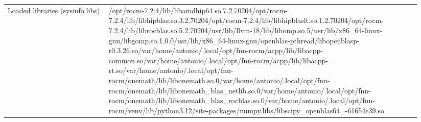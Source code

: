\begin{longtable}{>{\raggedright\arraybackslash}p{0.23\linewidth}>{\raggedright\arraybackslash}p{0.71\linewidth}}
Loaded libraries (sysinfo.libs) & /\allowbreak{}opt/\allowbreak{}rocm-7.2.4/\allowbreak{}lib/\allowbreak{}libamdhip64.so.7.2.70204\newline /\allowbreak{}opt/\allowbreak{}rocm-7.2.4/\allowbreak{}lib/\allowbreak{}libhipblas.so.3.2.70204\newline /\allowbreak{}opt/\allowbreak{}rocm-7.2.4/\allowbreak{}lib/\allowbreak{}libhipblaslt.so.1.2.70204\newline /\allowbreak{}opt/\allowbreak{}rocm-7.2.4/\allowbreak{}lib/\allowbreak{}librocblas.so.5.2.70204\newline /\allowbreak{}usr/\allowbreak{}lib/\allowbreak{}llvm-18/\allowbreak{}lib/\allowbreak{}libomp.so.5\newline /\allowbreak{}usr/\allowbreak{}lib/\allowbreak{}x86\_\allowbreak{}64-linux-gnu/\allowbreak{}libgomp.so.1.0.0\newline /\allowbreak{}usr/\allowbreak{}lib/\allowbreak{}x86\_\allowbreak{}64-linux-gnu/\allowbreak{}openblas-pthread/\allowbreak{}libopenblasp-r0.3.26.so\newline /\allowbreak{}var/\allowbreak{}home/\allowbreak{}antonio/\allowbreak{}.local/\allowbreak{}opt/\allowbreak{}fnn-rocm/\allowbreak{}acpp/\allowbreak{}lib/\allowbreak{}libacpp-common.so\newline /\allowbreak{}var/\allowbreak{}home/\allowbreak{}antonio/\allowbreak{}.local/\allowbreak{}opt/\allowbreak{}fnn-rocm/\allowbreak{}acpp/\allowbreak{}lib/\allowbreak{}libacpp-rt.so\newline /\allowbreak{}var/\allowbreak{}home/\allowbreak{}antonio/\allowbreak{}.local/\allowbreak{}opt/\allowbreak{}fnn-rocm/\allowbreak{}onemath/\allowbreak{}lib/\allowbreak{}libonemath.so.0\newline /\allowbreak{}var/\allowbreak{}home/\allowbreak{}antonio/\allowbreak{}.local/\allowbreak{}opt/\allowbreak{}fnn-rocm/\allowbreak{}onemath/\allowbreak{}lib/\allowbreak{}libonemath\_\allowbreak{}blas\_\allowbreak{}netlib.so.0\newline /\allowbreak{}var/\allowbreak{}home/\allowbreak{}antonio/\allowbreak{}.local/\allowbreak{}opt/\allowbreak{}fnn-rocm/\allowbreak{}onemath/\allowbreak{}lib/\allowbreak{}libonemath\_\allowbreak{}blas\_\allowbreak{}rocblas.so.0\newline /\allowbreak{}var/\allowbreak{}home/\allowbreak{}antonio/\allowbreak{}.local/\allowbreak{}opt/\allowbreak{}fnn-rocm/\allowbreak{}venv/\allowbreak{}lib/\allowbreak{}python3.12/\allowbreak{}site-packages/\allowbreak{}numpy.libs/\allowbreak{}libscipy\_\allowbreak{}openblas64\_\allowbreak{}-61654e39.so \\

\end{longtable}
